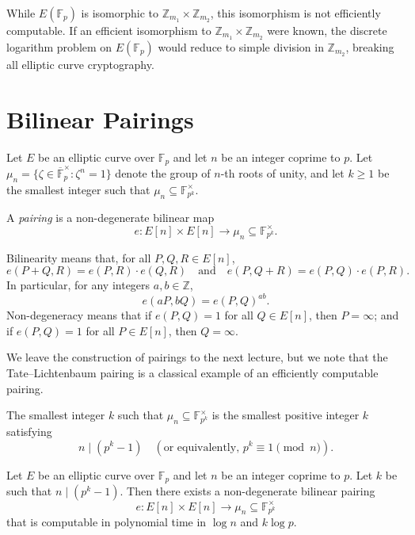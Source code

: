 \begin{remark}
    While \(E(\mathbb{F}_p)\) is isomorphic to \(\mathbb{Z}_{m_1} \times \mathbb{Z}_{m_2}\), this isomorphism is not efficiently computable.
    If an efficient isomorphism to \(\mathbb{Z}_{m_1} \times \mathbb{Z}_{m_2}\) were known, the discrete logarithm problem on \(E(\mathbb{F}_p)\) would reduce to simple division in \(\mathbb{Z}_{m_2}\), breaking all elliptic curve cryptography.
\end{remark}

\section*{Bilinear Pairings}

Let \(E\) be an elliptic curve over \(\mathbb{F}_p\) and let \(n\) be an integer coprime to \(p\).
Let \(\mu_n = \{ \zeta \in \overline{\mathbb{F}}_p^\times : \zeta^n = 1 \}\) denote the group of \(n\)-th roots of unity, and let \(k \geq 1\) be the smallest integer such that \(\mu_n \subseteq \mathbb{F}_{p^k}^\times\).

\begin{definition}[Pairing]\label{def:pairing}
    A \emph{pairing} is a non-degenerate bilinear map
    \[
        e \colon E[n] \times E[n] \to \mu_n \subseteq \mathbb{F}_{p^k}^\times.
    \]
\end{definition}

Bilinearity means that, for all \(P, Q, R \in E[n]\),
\[
    e(P + Q, R) = e(P, R) \cdot e(Q, R) \quad \text{and} \quad e(P, Q + R) = e(P, Q) \cdot e(P, R).
\]
In particular, for any integers \(a, b \in \mathbb{Z}\),
\[
    e(aP, bQ) = e(P, Q)^{ab}.
\]
Non-degeneracy means that if \(e(P, Q) = 1\) for all \(Q \in E[n]\), then \(P = \infty\); and if \(e(P, Q) = 1\) for all \(P \in E[n]\), then \(Q = \infty\).

We leave the construction of pairings to the next lecture, but we note that the Tate--Lichtenbaum pairing is a classical example of an efficiently computable pairing.

\begin{proposition}\label{prop:embedding-degree}
    The smallest integer \(k\) such that \(\mu_n \subseteq \mathbb{F}_{p^k}^\times\) is the smallest positive integer \(k\) satisfying
    \[
        n \mid (p^k - 1) \quad (\text{or equivalently, } p^k \equiv 1 \pmod{n}).
    \]
\end{proposition}

\begin{theorem}\label{thm:tate-pairing}
    Let \(E\) be an elliptic curve over \(\mathbb{F}_p\) and let \(n\) be an integer coprime to \(p\).
    Let \(k\) be such that \(n \mid (p^k - 1)\).
    Then there exists a non-degenerate bilinear pairing
    \[
        e \colon E[n] \times E[n] \to \mu_n \subseteq \mathbb{F}_{p^k}^\times
    \]
    that is computable in polynomial time in \(\log n\) and \(k \log p\).
\end{theorem}

